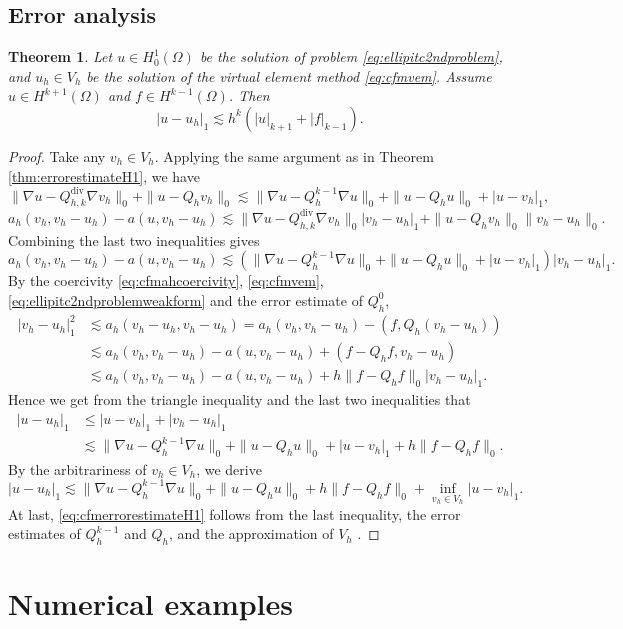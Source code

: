\documentclass[10pt]{amsart}
\newtheorem{theorem}{Theorem}[section]
\renewcommand{\div}{\operatorname{div}}
\numberwithin{equation}{section}
\begin{document}
\subsection{Error analysis}
\begin{theorem}
Let $u\in H_0^1(\Omega)$ be the solution of problem \eqref{eq:ellipitc2ndproblem}, and $u_h\in V_h$ be the solution of the virtual element method \eqref{eq:cfmvem}. Assume $u\in H^{k+1}(\Omega)$ and $f\in H^{k-1}(\Omega)$. Then
\begin{equation}\label{eq:cfmerrorestimateH1}
|u-u_h|_1\lesssim h^k(|u|_{k+1}+|f|_{k-1}).
\end{equation}
\end{theorem}
\begin{proof}
Take any $v_h\in V_h$. 
Applying the same argument as in Theorem \ref{thm:errorestimateH1}, we have
$$
\|\nabla u-Q_{h,k}^{\div}\nabla v_h\|_0+\|u-Q_hv_h\|_0\lesssim \|\nabla u-Q_h^{k-1}\nabla u\|_0+\|u-Q_hu\|_0+|u-v_h|_1,
$$
$$
a_h(v_h, v_h-u_h)-a(u,v_h-u_h)\lesssim \|\nabla u-Q_{h,k}^{\div}\nabla v_h\|_0|v_h-u_h|_1+\|u-Q_hv_h\|_0\|v_h-u_h\|_0.
$$
Combining the last two inequalities gives
$$
a_h(v_h, v_h-u_h)-a(u,v_h-u_h)\lesssim(\|\nabla u-Q_h^{k-1}\nabla u\|_0+\|u-Q_hu\|_0+|u-v_h|_1)|v_h-u_h|_1.
$$
By the coercivity \eqref{eq:cfmahcoercivity}, \eqref{eq:cfmvem}, \eqref{eq:ellipitc2ndproblemweakform} and the error estimate of $Q_h^0$,
\begin{align*}
|v_h-u_h|_1^2&\lesssim a_h(v_h-u_h, v_h-u_h)=a_h(v_h, v_h-u_h)-(f, Q_h(v_h-u_h)) \\
&\lesssim a_h(v_h, v_h-u_h)-a(u,v_h-u_h)+(f-Q_hf, v_h-u_h) \\
&\lesssim a_h(v_h, v_h-u_h)-a(u,v_h-u_h)+h\|f-Q_hf\|_0|v_h-u_h|_1.
\end{align*}
Hence we get from the triangle inequality and the last two inequalities that
\begin{align*}  
|u-u_h|_1&\leq|u-v_h|_1+|v_h-u_h|_1 \\
&\lesssim \|\nabla u-Q_h^{k-1}\nabla u\|_0+\|u-Q_hu\|_0+|u-v_h|_1+h\|f-Q_hf\|_0.
\end{align*}
By the arbitrariness of $v_h\in V_h$, we derive
$$
|u-u_h|_1\lesssim \|\nabla u-Q_h^{k-1}\nabla u\|_0+\|u-Q_hu\|_0+h\|f-Q_hf\|_0+\inf_{v_h\in V_h}|u-v_h|_1.
$$
At last, \eqref{eq:cfmerrorestimateH1} follows from the last inequality, the error estimates of $Q_h^{k-1}$ and $Q_h$, and the approximation of $V_h$ \cite{Huang2021,ChenHuang2018,BrennerSung2018,BeiraodaVeigaLovadinaRusso2017}.
\end{proof}




\section{Numerical examples}\label{sec:numericalexamps}









\end{document}
